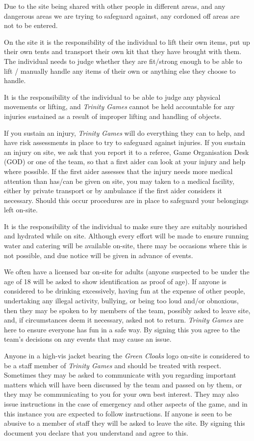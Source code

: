 Due to the site being shared with other people in different areas, and any dangerous areas we are trying to safeguard against, any cordoned off areas are not to be entered.

On the site it is the responsibility of the individual to lift their own items, put up their own tents and transport their own kit that they have brought with them. The individual needs to judge whether they are fit/strong enough to be able to lift / manually handle any items of their own or anything else they choose to handle.

It is the responsibility of the individual to be able to judge any physical movements or lifting, and \textit{Trinity Games} cannot be held accountable for any injuries sustained as a result of improper lifting and handling of objects.

If you sustain an injury, \textit{Trinity Games} will do everything they can to help, and have risk assessments in place to try to safeguard against injuries. If you sustain an injury on site, we ask that you report it to a referee, Game Organisation Desk (GOD) or one of the team, so that a first aider can look at your injury and help where possible. If the first aider assesses that the injury needs more medical attention than has/can be given on site, you may taken to a medical facility, either by private transport or by ambulance if the first aider considers it necessary. Should this occur procedures are in place to safeguard your belongings left on-site.

It is the responsibility of the individual to make sure they are suitably nourished and hydrated while on site. Although every effort will be made to ensure running water and catering will be available on-site, there may be occasions where this is not possible, and due notice will be given in advance of events.

We often have a licensed bar on-site for adults (anyone suspected to be under the age of 18 will be asked to show identification as proof of age). If anyone is considered to be drinking excessively, having fun at the expense of other people, undertaking any illegal activity, bullying, or being too loud and/or obnoxious, then they may be spoken to by members of the team, possibly asked to leave site, and, if circumstances deem it necessary, asked not to return. \textit{Trinity Games} are here to ensure everyone has fun in a safe way. By signing this you agree to the team's decisions on any events that may cause an issue.

Anyone in a high-vis jacket bearing the \textit{Green Cloaks} logo on-site is considered to be a staff member of \textit{Trinity Games} and should be treated with respect. Sometimes they may be asked to communicate with you regarding important matters which will have been discussed by the team and passed on by them, or they may be communicating to you for your own best interest. They may also issue instructions in the case of emergency and other aspects of the game, and in this instance you are expected to follow instructions. If anyone is seen to be abusive to a member of staff they will be asked to leave the site. By signing this document you declare that you understand and agree to this.

